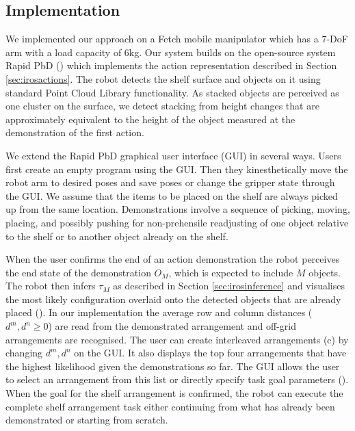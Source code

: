 \subsection{Implementation}
\label{sec:irosimplementation}

We implemented our approach on a Fetch mobile manipulator which has a 7-DoF arm with a load capacity of 6kg.
Our system builds on the open-source system Rapid PbD (\cite{rapidpbd}) which implements the action representation described in Section \ref{sec:irosactions}.
The robot detects the shelf surface and objects on it using standard Point Cloud Library functionality.
As stacked objects are perceived as one cluster on the surface, we detect stacking from height changes that are approximately equivalent to the height of the object measured at the demonstration of the first action.

We extend the Rapid PbD graphical user interface (GUI) in several ways.
Users first create an empty program using the GUI.
Then they kinesthetically move the robot arm to desired poses and save poses or change the gripper state through the GUI.
We assume that the items to be placed on the shelf are always picked up from the same location.
Demonstrations involve a sequence of picking, moving, placing, and possibly pushing for non-prehensile readjusting of one object relative to the shelf or to another object already on the shelf.

When the user confirms the end of an action demonstration the robot perceives the end state of the demonstration $O_M$, which is expected to include $M$ objects.
The robot then infers $\tau_M$ as described in Section \ref{sec:irosinference} and visualises the most likely configuration overlaid onto the detected objects that are already placed ().
In our implementation the average row and column distances ($d^m, d^n \geq 0$) are read from the demonstrated arrangement and off-grid arrangements are recognised.
The user can create interleaved arrangements (c) by changing $d^m, d^n$ on the GUI.
It also displays the top four arrangements that have the highest likelihood given the demonstrations so far.
The GUI allows the user to select an arrangement from this list or directly specify task goal parameters ().
When the goal for the shelf arrangement is confirmed, the robot can execute the complete shelf arrangement task either continuing from what has already been demonstrated or starting from scratch.


